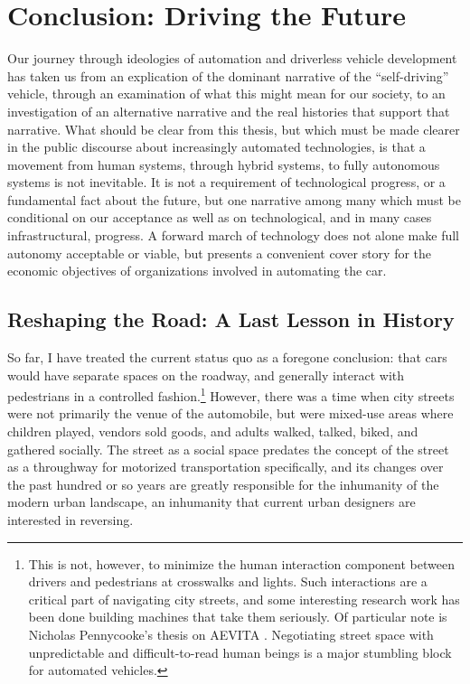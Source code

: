 \chapter{Conclusion: Driving the Future}
\label{chap:4}


Our journey through ideologies of automation and driverless vehicle
development has taken us from an explication of the dominant narrative
of the ``self-driving'' vehicle, through an examination of what this
might mean for our society, to an investigation of an alternative
narrative and the real histories that support that narrative. What
should be clear from this thesis, but which must be made clearer in the
public discourse about increasingly automated technologies, is that a
movement from human systems, through hybrid systems, to fully
autonomous systems is not inevitable. It is not a
requirement of technological progress, or a fundamental fact about the
future, but one narrative among many which must be conditional on our
acceptance as well as on technological, and in many cases
infrastructural, progress. A forward march of
technology does not alone make full autonomy acceptable or viable,
but presents a convenient cover story for the economic objectives of
organizations involved in automating the car.

\section{Reshaping the Road: A Last Lesson in History}

So far, I have treated the current status
quo as a foregone conclusion: that cars would have separate spaces on
the roadway, and generally interact with pedestrians in a controlled
fashion.\footnote{This is not, however, to minimize the human
  interaction component between drivers and pedestrians at crosswalks
  and lights. Such interactions are a critical part of navigating city
  streets, and some interesting research work has been done building
  machines that take them seriously. Of particular note is Nicholas
  Pennycooke's thesis on AEVITA \cite{aevita}. Negotiating street
  space with unpredictable and difficult-to-read human beings is a
  major stumbling block for automated vehicles.} However, there was a
time when city streets were not primarily the venue of the automobile,
but were mixed-use areas where children played, vendors sold goods,
and adults walked, talked, biked, and gathered socially. The street as
a social space predates the concept of the street as a throughway for
motorized transportation specifically, and its changes over the past
hundred or so years are greatly responsible for the inhumanity of the
modern urban landscape, an inhumanity that current urban designers are
interested in reversing. 

